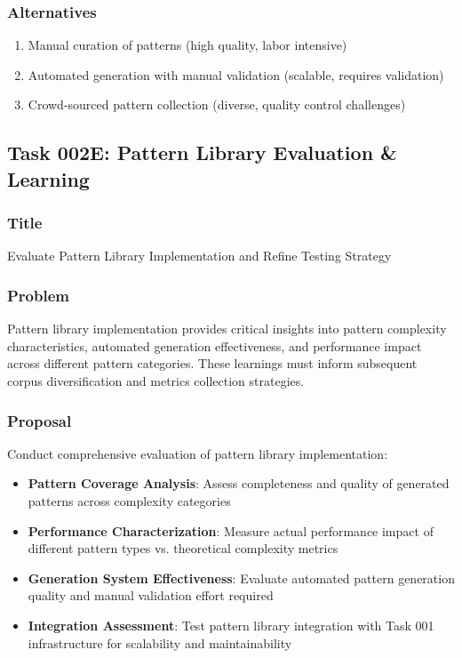 \documentclass[11pt,a4paper]{article}
\begin{document}
\subsubsection{Alternatives}
\begin{enumerate}
    \item Manual curation of patterns (high quality, labor intensive)
    \item Automated generation with manual validation (scalable, requires validation)
    \item Crowd-sourced pattern collection (diverse, quality control challenges)
\end{enumerate}

\subsection{Task 002E: Pattern Library Evaluation \& Learning}

\subsubsection{Title}
Evaluate Pattern Library Implementation and Refine Testing Strategy

\subsubsection{Problem}
Pattern library implementation provides critical insights into pattern complexity characteristics, automated generation effectiveness, and performance impact across different pattern categories. These learnings must inform subsequent corpus diversification and metrics collection strategies.

\subsubsection{Proposal}
Conduct comprehensive evaluation of pattern library implementation:
\begin{itemize}
    \item \textbf{Pattern Coverage Analysis}: Assess completeness and quality of generated patterns across complexity categories
    \item \textbf{Performance Characterization}: Measure actual performance impact of different pattern types vs. theoretical complexity metrics
    \item \textbf{Generation System Effectiveness}: Evaluate automated pattern generation quality and manual validation effort required
    \item \textbf{Integration Assessment}: Test pattern library integration with Task 001 infrastructure for scalability and maintainability
\end{itemize}
\end{document}
